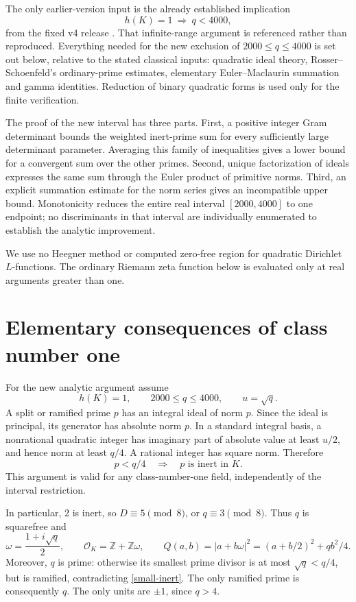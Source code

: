\documentclass[11pt]{article}
\newcommand{\Z}{\mathbb Z}
\newcommand{\OK}{\mathcal O_K}
\begin{document}
The only earlier-version input is the already established implication
\[
 h(K)=1\ \Longrightarrow\ q<4000,
\]
from the fixed v4 release \cite{v4}. That infinite-range argument is
referenced rather than reproduced. Everything needed for
the new exclusion of \(2000\le q\le4000\) is set out below, relative
to the stated classical inputs: quadratic ideal theory,
Rosser--Schoenfeld's ordinary-prime estimates, elementary
Euler--Maclaurin summation and gamma identities. Reduction of binary
quadratic forms is used only for the finite verification.

The proof of the new interval has three parts. First, a positive integer
Gram determinant bounds the weighted inert-prime sum for every
sufficiently large determinant parameter. Averaging this family of
inequalities gives a lower bound for a convergent sum over the other
primes. Second, unique factorization of ideals expresses the same sum
through the Euler product of primitive norms. Third, an explicit
summation estimate for the norm series gives an incompatible upper
bound. Monotonicity reduces the entire real interval
\([2000,4000]\) to one endpoint; no discriminants in that interval
are individually enumerated to establish the analytic improvement.

We use no Heegner method or computed zero-free region for quadratic
Dirichlet \(L\)-functions. The ordinary Riemann zeta function below is
evaluated only at real arguments greater than one.

\section{Elementary consequences of class number one}\label{elementary}

For the new analytic argument assume
\[
 h(K)=1,\qquad 2000\le q\le4000,\qquad u=\sqrt q.
\]
A split or ramified prime \(p\) has an integral ideal of norm \(p\).
Since the ideal is principal, its generator has absolute norm \(p\).
In a standard integral basis, a nonrational quadratic integer has
imaginary part of absolute value at least \(u/2\), and hence norm at
least \(q/4\). A rational integer has square norm. Therefore
\begin{equation}\label{small-inert}
 p<q/4\quad\Longrightarrow\quad p\text{ is inert in }K.
\end{equation}
This argument is valid for any class-number-one field, independently of
the interval restriction.

In particular, 2 is inert, so \(D\equiv5\pmod8\), or \(q\equiv3\pmod8\).
Thus \(q\) is squarefree and
\[
 \omega=\frac{1+i\sqrt q}{2},\qquad
 \OK=\Z+\Z\omega,\qquad
 Q(a,b)=|a+b\omega|^2=(a+b/2)^2+qb^2/4.
\]
Moreover, \(q\) is prime: otherwise its smallest prime divisor is at
most \(\sqrt q<q/4\), but is ramified, contradicting
\eqref{small-inert}. The only ramified prime is consequently \(q\).
The only units are \(\pm1\), since \(q>4\).
\end{document}
